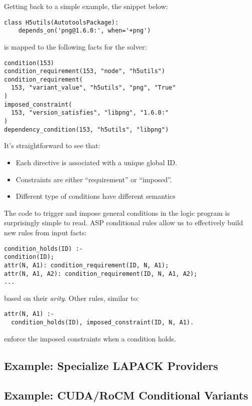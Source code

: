 Getting back to a simple example, the snippet below:
\begin{verbatim}
class H5utils(AutotoolsPackage):
    depends_on('png@1.6.0:', when='+png')
\end{verbatim}
is mapped to the following facts for the solver:
\begin{verbatim}
condition(153)
condition_requirement(153, "node", "h5utils")
condition_requirement(
  153, "variant_value", "h5utils", "png", "True"
)
imposed_constraint(
  153, "version_satisfies", "libpng", "1.6.0:"
)
dependency_condition(153, "h5utils", "libpng")
\end{verbatim}
It's straightforward to see that:
\begin{itemize}
\item Each directive is associated with a unique global ID.
\item Constraints are either ``requirement'' or ``imposed''. 
\item Different type of conditions have different semantics\footnotemark
\end{itemize}
The code to trigger and impose general conditions in the logic program is surprisingly simple to read. ASP conditional rules allow us to effectively build new rules from input facts:
\begin{verbatim}
condition_holds(ID) :-
condition(ID);
attr(N, A1): condition_requirement(ID, N, A1);
attr(N, A1, A2): condition_requirement(ID, N, A1, A2);
...
\end{verbatim}
based on their \emph{arity}. Other rules, similar to:
\begin{verbatim}
attr(N, A1) :- 
  condition_holds(ID), imposed_constraint(ID, N, A1).
\end{verbatim}
enforce the imposed constraints when a condition holds.

\subsection{Example: Specialize LAPACK Providers}
\subsection{Example: CUDA/RoCM Conditional Variants}
